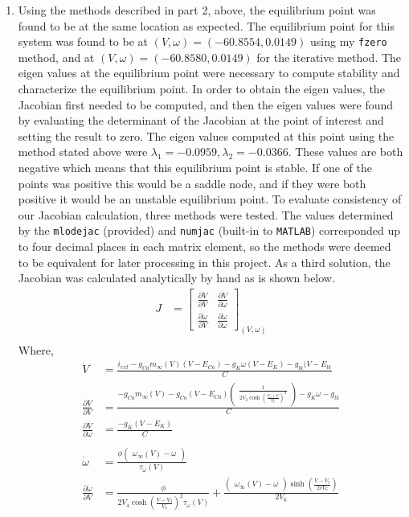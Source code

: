 \documentclass[10pt]{report}
\newcommand{\matlab}[1]{\texttt{#1}}
\newcommand{\p}{\begin{pmatrix}}
\newcommand{\pp}{\end{pmatrix}}
\newcommand{\bm}{\begin{bmatrix}}
\newcommand{\bb}{\end{bmatrix}}
\begin{document}
\begin{enumerate}
%
%
\item Using the methods described in part 2, above, the equilibrium point was found to be at the same location as expected. The equilibrium point for this system was found to be at $(V, \omega) = (-60.8554, 0.0149)$ using my \matlab{fzero} method, and at $(V, \omega) = (-60.8580, 0.0149)$ for the iterative method. The eigen values at the equilibrium point were necessary to compute stability and characterize the equilibrium point. In order to obtain the eigen values, the Jacobian first needed to be computed, and then the eigen values were found by evaluating the determinant of the Jacobian at the point of interest and setting the result to zero. The eigen values computed at this point using the method stated above were $\lambda_1 = -0.0959, \lambda_2 = -0.0366$. These values are both negative which means that this equilibrium point is stable. If one of the points was positive this would be a saddle node, and if they were both positive it would be an unstable equilibrium point. To evaluate consistency of our Jacobian calculation, three methods were tested. The values determined by the \matlab{mlodejac} (provided) and \matlab{numjac} (built-in to \matlab{MATLAB}) corresponded up to four decimal places in each matrix element, so the methods were deemed to be equivalent for later processing in this project. As a third solution, the Jacobian was calculated analytically by hand as is shown below.
\begin{align*}
J &= \bm \frac{\partial \dot{V}}{\partial V} & \frac{\partial \dot{V}}{\partial \omega} \\ \frac{\partial \dot{\omega}}{\partial V} & \frac{\partial \dot{\omega}}{\partial \omega} \bb_{(V, \omega)} \\
\end{align*}
Where, \\
\begin{align*}
\dot{V} & = \frac{i_{ext} - g_{Ca}m_{\infty}(V)(V-E_{Ca}) - g_K \omega (V - E_K) - g_{lk} (V- E_{lk}}{C} \\
\frac{\partial \dot{V}}{\partial V} &= \frac{-g_{Ca}m_{\infty}(V) - g_{Ca}(V -E_{Ca})\p \frac{1}{2 V_2 \cosh(\frac{V_1 + V}{V_2})^2}\pp - g_K \omega - g_{lk}}{C} \\
\frac{\partial \dot{V}}{\partial \omega} &= \frac{-g_K (V - E_K)}{C} \\ \\
\dot{\omega} &= \frac{\phi \p \omega_{\infty }(V) - \omega \pp}{\tau_{\omega }(V)} \\
\frac{\partial \dot{\omega}}{\partial V}  &= \frac{\phi}{2 V_4 \cosh(\frac{V-V_3}{V_4})^2 \tau_{\omega}(V)} + \frac{ \p \omega_{\infty}(V) - \omega \pp \sinh (\frac{V - V_5}{2vV_6})}{2V_6}\\

\end{align*}
\end{enumerate}
\end{document}
